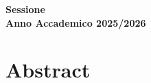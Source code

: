 \documentclass[12pt,a4paper,twoside]{book}
\begin{document}
\begin{titlepage}
\vspace{20mm}

\begin{center}
{\large\bf Sessione\\
Anno Accademico 2025/2026}
\end{center}

\end{titlepage}
\clearpage{\pagestyle{empty}\cleardoublepage}

\setlength{\parindent}{15pt}
\setlength{\parskip}{0pt}



\tableofcontents
\thispagestyle{chapterstar}
\clearpage
\pagestyle{fancy}
\cleardoublepage

\chapter*{Abstract}
\thispagestyle{chapterstar}
\label{abstract_It}
% 
\clearpage{\pagestyle{empty}\cleardoublepage}
\end{document}
